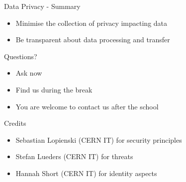 \documentclass{beamer}
\begin{document}
\begin{frame}{Data Privacy - Summary}
\begin{itemize}
\item Minimise the collection of privacy impacting data 
\item Be transparent about data processing and transfer
\end{itemize}
\end{frame}

\begin{frame}{Questions?}
\begin{itemize}
\item Ask now
\item Find us during the break
\item You are welcome to contact us after the school
\end{itemize}
\end{frame}

\begin{frame}{Credits}
	\begin{itemize}
		\item Sebastian Lopienski (CERN IT) for security principles
		\item Stefan Lueders (CERN IT) for threats
        \item Hannah Short (CERN IT) for identity aspects 
	\end{itemize}
\end{frame}

\backcover
\end{document}
